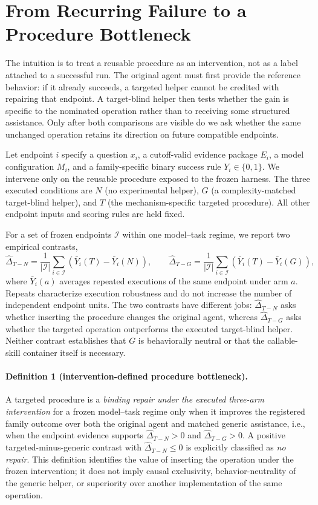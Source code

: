 \section{From Recurring Failure to a Procedure Bottleneck}
\label{sec:mechanism}
The intuition is to treat a reusable procedure as an intervention, not as a label attached to a successful run. The original agent must first provide the reference behavior: if it already succeeds, a targeted helper cannot be credited with repairing that endpoint. A target-blind helper then tests whether the gain is specific to the nominated operation rather than to receiving some structured assistance. Only after both comparisons are visible do we ask whether the same unchanged operation retains its direction on future compatible endpoints.

Let endpoint $i$ specify a question $x_i$, a cutoff-valid evidence package $E_i$, a model configuration $M_i$, and a family-specific binary success rule $Y_i\in\{0,1\}$. We intervene only on the reusable procedure exposed to the frozen harness. The three executed conditions are $N$ (no experimental helper), $G$ (a complexity-matched target-blind helper), and $T$ (the mechanism-specific targeted procedure). All other endpoint inputs and scoring rules are held fixed.

For a set of frozen endpoints $\mathcal I$ within one model--task regime, we report two empirical contrasts,
\begin{equation}
\widehat{\Delta}_{T-N}
= \frac{1}{|\mathcal I|}\sum_{i\in\mathcal I}\left(\bar Y_i(T)-\bar Y_i(N)\right),
\qquad
\widehat{\Delta}_{T-G}
= \frac{1}{|\mathcal I|}\sum_{i\in\mathcal I}\left(\bar Y_i(T)-\bar Y_i(G)\right),
\end{equation}
where $\bar Y_i(a)$ averages repeated executions of the same endpoint under arm $a$. Repeats characterize execution robustness and do not increase the number of independent endpoint units. The two contrasts have different jobs: $\widehat{\Delta}_{T-N}$ asks whether inserting the procedure changes the original agent, whereas $\widehat{\Delta}_{T-G}$ asks whether the targeted operation outperforms the executed target-blind helper. Neither contrast establishes that $G$ is behaviorally neutral or that the callable-skill container itself is necessary.

\paragraph{Definition 1 (intervention-defined procedure bottleneck).}
A targeted procedure is a \emph{binding repair under the executed three-arm intervention} for a frozen model--task regime only when it improves the registered family outcome over both the original agent and matched generic assistance, i.e., when the endpoint evidence supports $\widehat{\Delta}_{T-N}>0$ and $\widehat{\Delta}_{T-G}>0$. A positive targeted-minus-generic contrast with $\widehat{\Delta}_{T-N}\leq0$ is explicitly classified as \emph{no repair}. This definition identifies the value of inserting the operation under the frozen intervention; it does not imply causal exclusivity, behavior-neutrality of the generic helper, or superiority over another implementation of the same operation.

